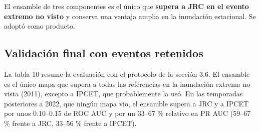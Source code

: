 El ensamble de tres componentes es el único que \textbf{supera a JRC en el evento extremo no visto} y conserva una ventaja amplia en la inundación estacional. Se adoptó como producto.

\subsection{Validación final con eventos retenidos}

La tabla 10 resume la evaluación con el protocolo de la sección 3.6. El ensamble es el único mapa que supera a todas las referencias en la inundación extrema no vista (2011), excepto a IPCET, que probablemente la usó. En las temporadas posteriores a 2022, que ningún mapa vio, el ensamble supera a JRC y a IPCET por unos 0.10--0.15 de ROC AUC y por un 33--67 \% relativo en PR AUC (59--67 \% frente a JRC, 33--56 \% frente a IPCET).

